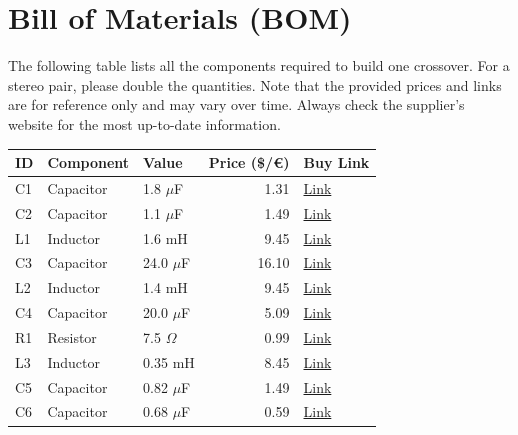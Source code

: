 \documentclass[11pt,a4paper]{report}
\begin{document}
\chapter{Bill of Materials (BOM)}
The following table lists all the components required to build one crossover. For a stereo pair, please double the quantities. Note that the provided prices and links are for reference only and may vary over time. Always check the supplier's website for the most up-to-date information.

\vspace{0.5cm}
\begin{table}[H]
    \centering
    \renewcommand{\arraystretch}{1.5}
    \begin{tabular}{@{}lllrl@{}}
        \toprule
        \textbf{ID} & \textbf{Component} & \textbf{Value} & \textbf{Price (\$/€)} & \textbf{Buy Link} \\
        \midrule
        C1 & Capacitor & 1.8 $\mu$F & 1.31 & \href{https://www.parts-express.com/Jantzen-0237-1.8uF-400V-Crosscap-Capacitor-027-914}{Link} \\
        C2 & Capacitor & 1.1 $\mu$F & 1.49 & \href{https://www.soundimports.eu/en/jantzen-audio-001-0232.html}{Link} \\
        L1 & Inductor & 1.6 mH & 9.45 & \href{https://www.soundimports.eu/en/jantzen-audio-000-2389.html}{Link} \\
        C3 & Capacitor & 24.0 $\mu$F & 16.10 & \href{https://www.parts-express.com/Solen-24uF-400V-Polypropylene-Capacitor-027-586}{Link} \\
        L2 & Inductor & 1.4 mH & 9.45 & \href{https://www.soundimports.eu/en/jantzen-audio-000-2388.html}{Link} \\
        C4 & Capacitor & 20.0 $\mu$F & 5.09 & \href{https://www.parts-express.com/Solen-20uF-400V-Polypropylene-Capacitor-027-582}{Link} \\
        R1 & Resistor & 7.5 $\Omega$ & 0.99 & \href{https://www.soundimports.eu/en/jantzen-audio-002-0793.html}{Link} \\
        L3 & Inductor & 0.35 mH & 8.45 & \href{https://www.soundimports.eu/en/jantzen-audio-000-1009.html}{Link} \\
        C5 & Capacitor & 0.82 $\mu$F & 1.49 & \href{https://www.soundimports.eu/en/jantzen-audio-001-0228.html}{Link} \\
        C6 & Capacitor & 0.68 $\mu$F & 0.59 & \href{https://www.parts-express.com/Dayton-Audio-DMPC-0.68-0.68uF-250V-Polypropylene-Capacitor-027-408}{Link} \\

\end{tabular}
\end{table}
\end{document}
